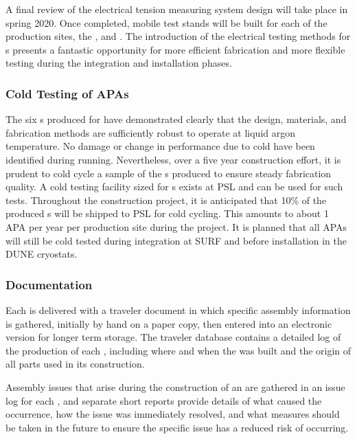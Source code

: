 A final review of the electrical tension measuring system design will take place in spring 2020. Once completed, mobile  test stands will be built for each of the  production sites, the , and .  The introduction of the electrical testing methods for s presents a fantastic opportunity for more efficient  fabrication and more flexible testing during the integration and installation phases.    


\subsubsection{Cold Testing of APAs}
\label{sec:fdsp-apa-prod-coldtest}

The six s produced for  have demonstrated clearly that the  design, materials, and fabrication methods are sufficiently robust to operate at liquid argon temperature.  No damage or change in performance due to cold have been identified during  running.  Nevertheless, over a five year construction effort, it is prudent to cold cycle a sample of the s produced to ensure steady fabrication quality.  A cold testing facility sized for  s exists at PSL and can be used for such tests. Throughout the construction project, it is anticipated that 10\% of the produced s will be shipped to PSL for cold cycling.  This amounts to about 1 APA per year per production site during the project.  It is planned that all APAs will still be cold tested during integration at SURF and before installation in the DUNE cryostats.      


\subsubsection{Documentation} 
\label{sec:fdsp-apa-prod-doc}

Each  is delivered with a traveler document in which specific assembly information is gathered, initially by hand on a paper copy, then entered into an electronic version for longer term storage.  The traveler database contains a detailed log of the production of each , including where and when the  was built and the origin of all parts used in its construction. 

Assembly issues that arise during the construction of an  are gathered in an issue log for each , and separate short reports provide details of what caused the occurrence, how the issue was immediately resolved, and what measures should be taken in the future to ensure the specific issue has a reduced risk of occurring.  
